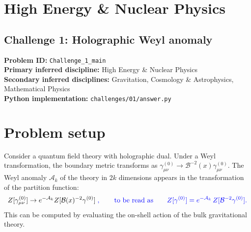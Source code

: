 \section{High Energy \& Nuclear Physics}
\subsection[Challenge 1: Holographic Weyl anomaly]{Challenge 1: Holographic Weyl anomaly}
\textbf{Problem ID:} \texttt{Challenge\_1\_main}\\
\textbf{Primary inferred discipline:} High Energy \& Nuclear Physics\\
\textbf{Secondary inferred disciplines:} Gravitation, Cosmology \& Astrophysics, Mathematical Physics\\
\textbf{Python implementation:} \texttt{challenges/01/answer.py}

\section*{Problem setup}
Consider a quantum field theory with holographic dual. Under a Weyl transformation, the boundary metric transforms as $\gamma^{(0)}_{\mu\nu}\to\mathcal B^{-2}(x)\gamma^{(0)}_{\mu\nu}$. The Weyl anomaly $\mathcal A_k$ of the theory in $2k$ dimensions appears in the transformation of the partition function:
\begin{equation}
Z[\gamma^{(0)}_{\mu\nu}]\to e^{-\mathcal A_k}Z[\mathcal B(x)^{-2}\gamma^{(0)}]\;\textcolor{blue}{,\qquad\text{to be read as}\qquad Z[\gamma^{(0)}]=e^{-\mathcal A_k}\,Z[\mathcal B^{-2}\gamma^{(0)}].}
\label{eq:1}
\end{equation}
This can be computed by evaluating the on-shell action of the bulk gravitational theory.

